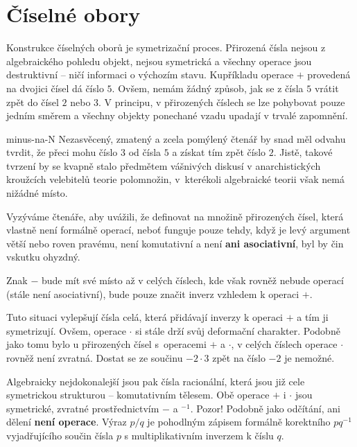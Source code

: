 \section{Číselné obory}
\label{sec:ciselne-obory}

Konstrukce číselných oborů je symetrizační proces. Přirozená čísla nejsou z
algebraického pohledu  objekt, nejsou symetrická a všechny operace
jsou destruktivní -- ničí informaci o výchozím stavu. Kupříkladu operace $+$
provedená na dvojici čísel dá číslo $5$. Ovšem, nemám žádný způsob, jak se z
čísla $5$ vrátit zpět do čísel $2$ nebo $3$. V principu, v přirozených číslech
se lze pohybovat pouze jedním směrem a všechny objekty ponechané vzadu upadají v
trvalé zapomnění.

\begin{warning}{}{minus-na-N}
 Nezasvěcený, zmatený a zcela pomýlený čtenář by snad měl odvahu tvrdit, že
 přeci mohu číslo $3$ od čísla $5$ \textbf{} a získat tím zpět
 číslo $2$. Jistě, takové tvrzení by se kvapně stalo předmětem vášnivých diskusí
 v anarchistických kroužcích velebitelů teorie polomnožin, v~kterékoli
 algebraické teorii však nemá nižádné místo.

 Vyzýváme čtenáře, aby uvážili, že definovat  na množině
 přirozených čísel, která vlastně není formálně operací, neboť funguje pouze
 tehdy, když je levý argument větší nebo roven pravému, není komutativní a není
 \textbf{ani asociativní}, byl by čin vskutku ohyzdný.

 Znak $-$ bude mít své místo až v celých číslech, kde však rovněž nebude operací
 (stále není asociativní), bude pouze značit inverz vzhledem k operaci $+$.
\end{warning}

Tuto situaci vylepšují čísla celá, která přidávají inverzy k operaci $+$ a tím
ji symetrizují. Ovšem, operace $ \cdot $ si stále drží svůj deformační
charakter. Podobně jako tomu bylo u přirozených čísel s~operacemi $+$ a $ \cdot
$, v celých číslech operace $ \cdot $ rovněž není zvratná. Dostat se ze součinu
$-2 \cdot 3$ zpět na číslo $-2$ je nemožné.

Algebraicky nejdokonalejší jsou pak čísla racionální, která jsou již cele
symetrickou strukturou -- komutativním tělesem. Obě operace $+$ i $ \cdot $ jsou
symetrické, zvratné prostřednictvím $-$ a $^{-1}$. Pozor! Podobně jako odčítání,
ani dělení \textbf{není operace}. Výraz $p / q$ je pohodlným zápisem formálně
korektního $pq^{-1}$ vyjadřujícího součin čísla $p$ s multiplikativním inverzem
k číslu $q$.

